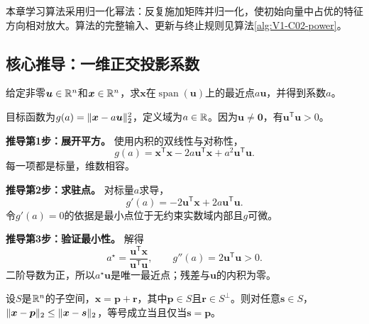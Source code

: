 \label{schema:V1-C02:CH-10}
本章学习算法采用归一化幂法：反复施加矩阵并归一化，使初始向量中占优的特征方向相对放大。算法的完整输入、更新与终止规则见算法\ref{alg:V1-C02-power}。

\subsection*{核心推导：一维正交投影系数}

\begin{derivationgoalbox}\label{schema:V1-C02:CH-11}
给定非零$\boldsymbol{u}\in\mathbb{R}^n$和$\boldsymbol{x}\in\mathbb{R}^n$，求$\boldsymbol{x}$在$\operatorname{span}(\boldsymbol{u})$上的最近点$a\boldsymbol{u}$，并得到系数$a$。
\end{derivationgoalbox}
\begin{derivationprepbox}
目标函数为$g(a)=\lVert\boldsymbol{x}-a\boldsymbol{u}\rVert_2^2$，定义域为$a\in\mathbb{R}$。因为$\boldsymbol{u}\ne\boldsymbol0$，有$\boldsymbol{u}^{\mathsf T}\boldsymbol{u}>0$。
\end{derivationprepbox}
\textbf{推导第1步：展开平方。} 使用内积的双线性与对称性，
\[
g(a)=\boldsymbol{x}^{\mathsf T}\boldsymbol{x}-2a\boldsymbol{u}^{\mathsf T}\boldsymbol{x}
+a^2\boldsymbol{u}^{\mathsf T}\boldsymbol{u}.
\]
每一项都是标量，维数相容。

\textbf{推导第2步：求驻点。} 对标量$a$求导，
\[
g'(a)=-2\boldsymbol{u}^{\mathsf T}\boldsymbol{x}
+2a\boldsymbol{u}^{\mathsf T}\boldsymbol{u}.
\]
令$g'(a)=0$的依据是最小点位于无约束实数域内部且$g$可微。

\textbf{推导第3步：验证最小性。} 解得
\[
a^{\star}=\frac{\boldsymbol{u}^{\mathsf T}\boldsymbol{x}}
{\boldsymbol{u}^{\mathsf T}\boldsymbol{u}},\qquad
g''(a)=2\boldsymbol{u}^{\mathsf T}\boldsymbol{u}>0.
\]
二阶导数为正，所以$a^{\star}\boldsymbol{u}$是唯一最近点；残差与$\boldsymbol{u}$的内积为零。

\begin{theorem}[子空间正交投影的最佳逼近]\label{thm:V1-C02-best-projection}\label{schema:V1-C02:CH-12}
设$S$是$\mathbb{R}^n$的子空间，$\boldsymbol{x}=\boldsymbol{p}+\boldsymbol{r}$，其中$\boldsymbol{p}\in S$且$\boldsymbol{r}\in S^{\perp}$。则对任意$\boldsymbol{s}\in S$，
$\lVert\boldsymbol{x}-\boldsymbol{p}\rVert_2\le\lVert\boldsymbol{x}-\boldsymbol{s}\rVert_2$，等号成立当且仅当$\boldsymbol{s}=\boldsymbol{p}$。
\end{theorem}
